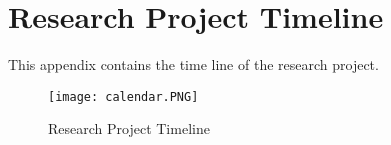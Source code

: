%
%
%                 

\chapter{Research Project Timeline}
\label{sec:appendixc}

This appendix contains the time line of the research project.

\begin{figure}[!t]
	\centering
	\captionsetup{justification=centering}
	\texttt{[image: calendar.PNG]}
	\caption{Research Project Timeline}
	\label{fig:calendar}
\end{figure}

